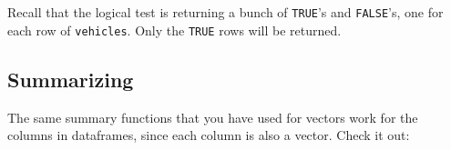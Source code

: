 \documentclass[
]{book}
\newenvironment{Shaded}{\begin{snugshade}}{\end{snugshade}}
\newcommand{\DecValTok}[1]{\textcolor[rgb]{0.00,0.00,0.81}{#1}}
\newcommand{\FloatTok}[1]{\textcolor[rgb]{0.00,0.00,0.81}{#1}}
\newcommand{\KeywordTok}[1]{\textcolor[rgb]{0.13,0.29,0.53}{\textbf{#1}}}
\newcommand{\NormalTok}[1]{#1}
\newcommand{\OperatorTok}[1]{\textcolor[rgb]{0.81,0.36,0.00}{\textbf{#1}}}
\newcommand{\StringTok}[1]{\textcolor[rgb]{0.31,0.60,0.02}{#1}}
\begin{document}
Recall that the logical test is returning a bunch of \texttt{TRUE}'s and \texttt{FALSE}'s, one for each row of \texttt{vehicles}. Only the \texttt{TRUE} rows will be returned.

\hypertarget{summarizing}{%
\subsection*{Summarizing}\label{summarizing}}

The same summary functions that you have used for vectors work for the columns in dataframes, since each column is also a vector. Check it out:

\begin{Shaded}
\end{Shaded}

\begin{Shaded}
\end{Shaded}

\begin{Shaded}
\end{Shaded}

\begin{Shaded}
\end{Shaded}

\begin{Shaded}
\end{Shaded}
\end{document}
